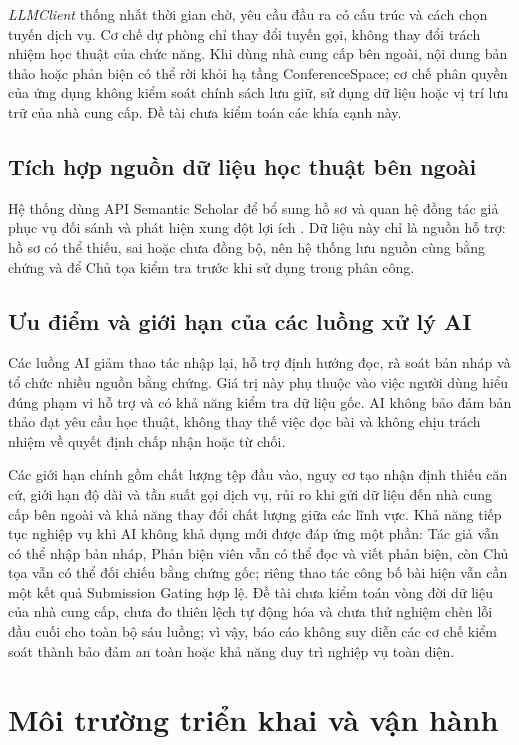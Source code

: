 \textit{LLMClient} thống nhất thời gian chờ, yêu cầu đầu ra có cấu trúc và cách chọn tuyến dịch vụ. Cơ chế dự phòng chỉ thay đổi tuyến gọi, không thay đổi trách nhiệm học thuật của chức năng. Khi dùng nhà cung cấp bên ngoài, nội dung bản thảo hoặc phản biện có thể rời khỏi hạ tầng ConferenceSpace; cơ chế phân quyền của ứng dụng không kiểm soát chính sách lưu giữ, sử dụng dữ liệu hoặc vị trí lưu trữ của nhà cung cấp. Đề tài chưa kiểm toán các khía cạnh này.

\subsection{Tích hợp nguồn dữ liệu học thuật bên ngoài}

Hệ thống dùng API Semantic Scholar để bổ sung hồ sơ và quan hệ đồng tác giả phục vụ đối sánh và phát hiện xung đột lợi ích \cite{ch3ref16}. Dữ liệu này chỉ là nguồn hỗ trợ: hồ sơ có thể thiếu, sai hoặc chưa đồng bộ, nên hệ thống lưu nguồn cùng bằng chứng và để Chủ tọa kiểm tra trước khi sử dụng trong phân công.

\subsection{Ưu điểm và giới hạn của các luồng xử lý AI}

Các luồng AI giảm thao tác nhập lại, hỗ trợ định hướng đọc, rà soát bản nháp và tổ chức nhiều nguồn bằng chứng. Giá trị này phụ thuộc vào việc người dùng hiểu đúng phạm vi hỗ trợ và có khả năng kiểm tra dữ liệu gốc. AI không bảo đảm bản thảo đạt yêu cầu học thuật, không thay thế việc đọc bài và không chịu trách nhiệm về quyết định chấp nhận hoặc từ chối.

Các giới hạn chính gồm chất lượng tệp đầu vào, nguy cơ tạo nhận định thiếu căn cứ, giới hạn độ dài và tần suất gọi dịch vụ, rủi ro khi gửi dữ liệu đến nhà cung cấp bên ngoài và khả năng thay đổi chất lượng giữa các lĩnh vực. Khả năng tiếp tục nghiệp vụ khi AI không khả dụng mới được đáp ứng một phần: Tác giả vẫn có thể nhập bản nháp, Phản biện viên vẫn có thể đọc và viết phản biện, còn Chủ tọa vẫn có thể đối chiếu bằng chứng gốc; riêng thao tác công bố bài hiện vẫn cần một kết quả Submission Gating hợp lệ. Đề tài chưa kiểm toán vòng đời dữ liệu của nhà cung cấp, chưa đo thiên lệch tự động hóa và chưa thử nghiệm chèn lỗi đầu cuối cho toàn bộ sáu luồng; vì vậy, báo cáo không suy diễn các cơ chế kiểm soát thành bảo đảm an toàn hoặc khả năng duy trì nghiệp vụ toàn diện.

\section{Môi trường triển khai và vận hành}
\label{sec:ch3-deployment-cut}

